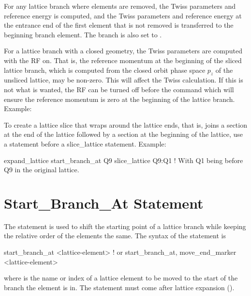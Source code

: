 {{{{{For any lattice branch where elements are removed, the Twiss parameters and reference energy is
computed, and the Twiss parameters and reference energy at the entrance end of the first element
that is not removed is transferred to the beginning branch element. The branch  is also
set to .

For a lattice branch with a closed geometry, the Twiss parameters are computed with the RF on. That
is, the reference momentum at the beginning of the sliced lattice branch, which is computed from the
closed orbit phase space $p_z$ of the unsliced lattice, may be non-zero. This will affect the Twiss
calculation. If this is not what is wanted, the RF can be turned off before the 
command which will ensure the reference momentum is zero at the beginning of the lattice
branch. Example:

To create a lattice slice that wraps around the lattice ends, that is, joins a section at the end of
the lattice followed by a section at the beginning of the lattice, use a 
statement before a slice_lattice statement. Example:
\begin{example}
  expand_lattice
  start_branch_at Q9
  slice_lattice Q9:Q1   ! With Q1 being before Q9 in the original lattice.
\end{example}

\section{Start_Branch_At Statement}
\label{s:start.branch}

The  statement is used to shift the starting point of a lattice branch while
keeping the relative order of the elements the same. The syntax of the 
statement is
\begin{example}
  start_branch_at <lattice-element>                    ! or
  start_branch_at, move_end_marker <lattice-element>
\end{example}
where  is the name or index of a lattice element to be moved to the start of
the branch the element is in. The  statement must come after lattice expansion
().

}}}}}
